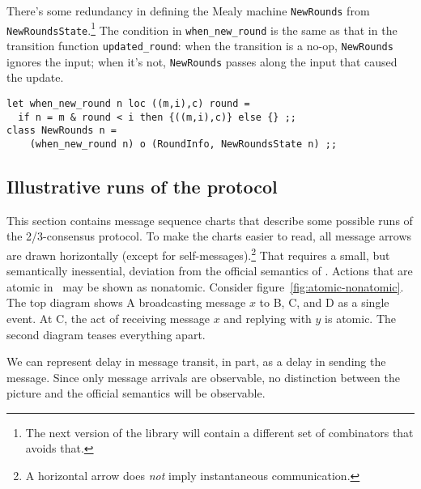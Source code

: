 \documentclass[final]{article}
\begin{document}
There's some redundancy in defining the Mealy machine
\lstinline{NewRounds} from \lstinline{NewRoundsState}.\footnote{The
  next version of the library will contain a different set of
  combinators that avoids that.}  The condition in
\lstinline{when_new_round} is the same as that in the transition
function \lstinline{updated_round}: when the transition is a no-op,
\lstinline{NewRounds} ignores the input; when it's not,
\lstinline{NewRounds} passes along the input that caused the update.
\begin{emlcode}
\begin{lstlisting}
let when_new_round n loc ((m,i),c) round =
  if n = m & round < i then {((m,i),c)} else {} ;;
class NewRounds n = 
    (when_new_round n) o (RoundInfo, NewRoundsState n) ;;
\end{lstlisting}
\end{emlcode}

\subsection{Illustrative runs of the protocol}
\label{sec:consensus-runs}

This section contains message sequence charts that describe some
possible runs of the 2/3-consensus protocol.  To make the charts
easier to read, all message arrows are drawn horizontally (except for
self-messages).\footnote{A horizontal arrow does \emph{not} imply
  instantaneous communication.}  That requires a small, but
semantically inessential, deviation from the official semantics of
\eml.  Actions that are atomic in \eml\ may be shown as nonatomic.
Consider figure~\ref{fig:atomic-nonatomic}.  The top diagram shows A
broadcasting message $x$ to B, C, and D as a single event.  At C, the
act of receiving message $x$ and replying with $y$ is atomic.  The
second diagram teases everything apart.

We can represent delay in message transit, in part, as a delay in
sending the message.  Since only message arrivals are observable, no
distinction between the picture and the official semantics will be
observable.
\end{document}
